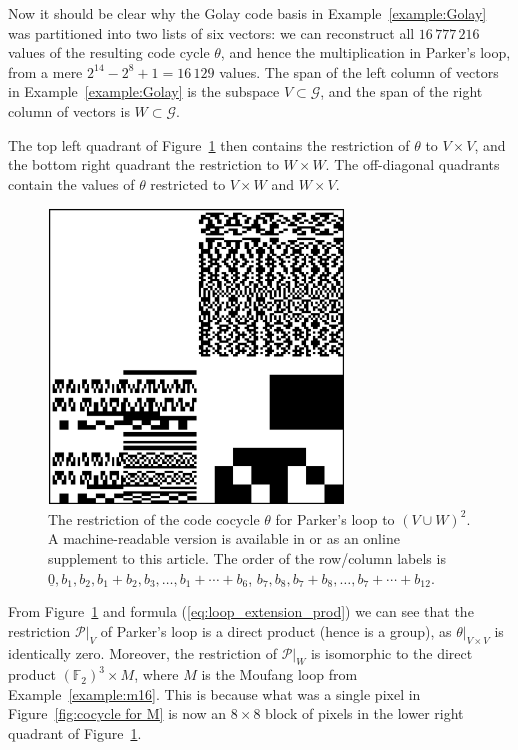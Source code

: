 \documentclass{article}
\theoremstyle{plain}
\theoremstyle{definition}
\def \cG {\mathcal{G}}
\def \cP {\mathcal{P}}
\def \FF {\mathbb{F}}
\begin{document}
Now it should be clear why the Golay code basis in Example~\ref{example:Golay} was partitioned into two lists of six vectors: we can reconstruct all $16\,777\,216$ values of the resulting code cycle $\theta$, and hence the multiplication in Parker's loop, from a mere $2^{14} - 2^8 + 1 = 16\,129$ values.
The span of the left column of vectors in Example~\ref{example:Golay} is the subspace $V\subset \cG$, and the span of the right column of vectors is $W\subset \cG$.

The top left quadrant of Figure~\ref{fig:Parker cocycle} then contains the restriction of $\theta$ to $V\times V$, and the bottom right quadrant the restriction to $W\times W$. 
The off-diagonal quadrants contain the values of $\theta$ restricted to $V\times W$ and $W\times V$.
\begin{figure}[!b]
\begin{center}
\includegraphics[width=0.7\textwidth]{alpha_awesum}
\end{center}
\caption{The restriction of the code cocycle $\theta$ for Parker's loop to $(V\cup W)^2$. A machine-readable version is available in \cite{RN_GH} or as an online supplement to this article. The order of the row/column labels is $\underline{0},b_1,b_2,b_1+b_2,b_3,\ldots, b_1+\cdots +b_6$, $b_7,b_8,b_7+b_8,\ldots,b_7+\cdots + b_{12}$.}
\label{fig:Parker cocycle}
\end{figure}
From Figure~\ref{fig:Parker cocycle} and formula (\ref{eq:loop_extension_prod}) we can see that the restriction $\cP\big|_V$ of Parker's loop is a direct product (hence is a group), as $\theta\big|_{V\times V}$ is identically zero. 
Moreover, the restriction of $\cP\big|_W$ is isomorphic to the direct product $(\FF_2)^3 \times M$, where $M$ is the Moufang loop from Example~\ref{example:m16}.
This is because what was a single pixel in Figure~\ref{fig:cocycle for M} is now an $8\times 8$ block of pixels in the lower right quadrant of Figure~\ref{fig:Parker cocycle}.
\end{document}

